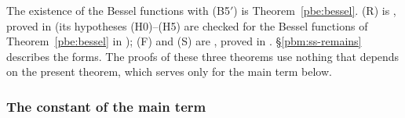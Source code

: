 \documentclass[10pt]{amsart}
\theoremstyle{definition}
\theoremstyle{remark}
\begin{document}
\smallskip\noindent The existence of the Bessel functions with \textup{(B5$'$)} is
Theorem~\ref{pbe:bessel}. \textup{(R)} is {\cite[Theorem~2.17]{P52}}, proved in {\cite[\S\S2, 3 and~4]{P52}} (its hypotheses (H0)--(H5) are checked for the Bessel functions of
Theorem~\ref{pbe:bessel} in {\cite[\S4]{P52}}); \textup{(F)} and \textup{(S)} are {\cite[Theorems~5.28 and~5.29]{P52}}, proved in {\cite[\S\S5 and~6]{P52}}. \S\ref{pbm:ss-remains} describes the forms. The proofs of these three theorems use nothing that depends on the present theorem, which serves only for the main term below.\par\smallskip

\subsubsection{The constant of the main term}\label{pbm:ss-const}
\end{document}
